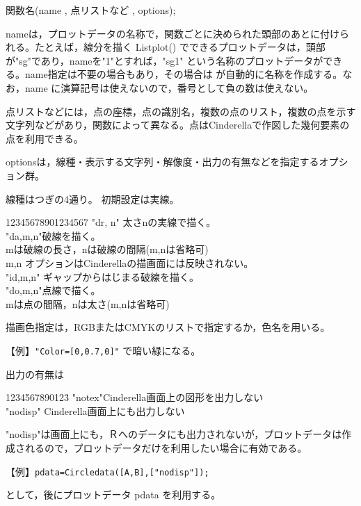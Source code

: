 \documentclass[papersize,a4paper,10pt,uplatex]{jsarticle}
\begin{document}
\hspace{20mm} 関数名(name , 点リストなど , options);

nameは，プロットデータの名称で，関数ごとに決められた頭部のあとに付けられる。たとえば，線分を描く Listplot() でできるプロットデータは，頭部が"sg"であり，nameを"1"とすれば，"sg1" という名称のプロットデータができる。name指定は不要の場合もあり，その場合は \ketcindy が自動的に名称を作成する。なお，name に演算記号は使えないので，番号として負の数は使えない。

点リストなどには，点の座標，点の識別名，複数の点のリスト，複数の点を示す文字列などがあり，関数によって異なる。点はCinderellaで作図した幾何要素の点を利用できる。

optionsは，線種・表示する文字列・解像度・出力の有無などを指定するオプション群。

 線種はつぎの4通り。 初期設定は実線。

\begin{tabbing}
1234\=5678901234567\=\kill
\>"dr, n" \>太さnの実線で描く。\\
\>"da,m,n"\>破線を描く。\\
\>\> mは破線の長さ，nは破線の間隔(m,nは省略可)\\
\> \>m,n オプションはCinderellaの描画面には反映されない。\\
\>"id,m,n" \>ギャップからはじまる破線を描く。\\
\>"do,m,n"\>点線で描く。\\
\>\>mは点の間隔，nは太さ(m,nは省略可)
\end{tabbing}

描画色指定は，RGBまたはCMYKのリストで指定するか，色名を用いる。

\hspace{10mm}【例】\verb|"Color=[0,0.7,0]"| で暗い緑になる。

出力の有無は
\begin{tabbing}
1234\=567890123\=\kill
 \>"notex"\>Cinderella画面上の図形を出力しない\\
 \>"nodisp" \>Cinderella画面上にも出力しない
 \end{tabbing}
 
 "nodisp"は画面上にも，Ｒへのデータにも出力されないが，プロットデータは作成されるので，プロットデータだけを利用したい場合に有効である。
 
\hspace{10mm}【例】\verb|pdata=Circledata([A,B],["nodisp"]);|

として，後にプロットデータ pdata を利用する。
\end{document}
